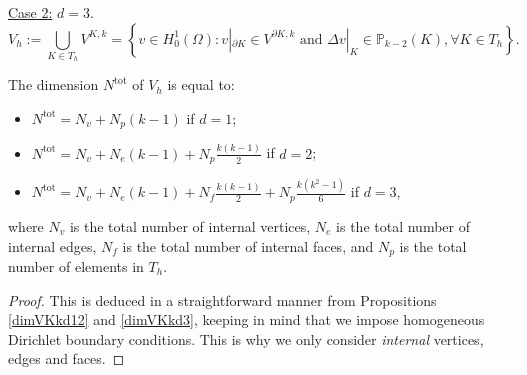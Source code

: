 \noindent \underline{Case 2:} $d=3$.
$$
V_h := \bigcup_{K\in T_h} V^{K,k} = \left\{v\in H^1_0(\Omega): v|_{\partial K} \in V^{\partial K, k} \text{ and } \Delta v|_K \in \mathbb{P}_{k-2}(K), \forall K\in T_h \right\}.
$$

\begin{proposition}
The dimension $N^\text{tot}$ of $V_h$ is equal to:
\begin{itemize}
\item $N^\text{tot} = N_v + N_p(k-1)$ if $d=1$;
\item $N^\text{tot} = N_v + N_e(k-1) + N_p\frac{k(k-1)}{2}$ if $d=2$;
\item $N^\text{tot} = N_v + N_e(k-1) + N_f\frac{k(k-1)}{2} + N_p\frac{k(k^2-1)}{6}$ if $d=3$, 
\end{itemize}
where $N_v$ is the total number of internal vertices, $N_e$ is the total number of internal edges, $N_f$ is the total number of internal faces, and $N_p$ is the total number of elements in $T_h$. 
\end{proposition}

\begin{proof}
This is deduced in a straightforward manner from Propositions \ref{dimVKkd12} and \ref{dimVKkd3}, keeping in mind that we impose homogeneous Dirichlet boundary conditions. This is why we only consider \emph{internal} vertices, edges and faces. 
\end{proof}

